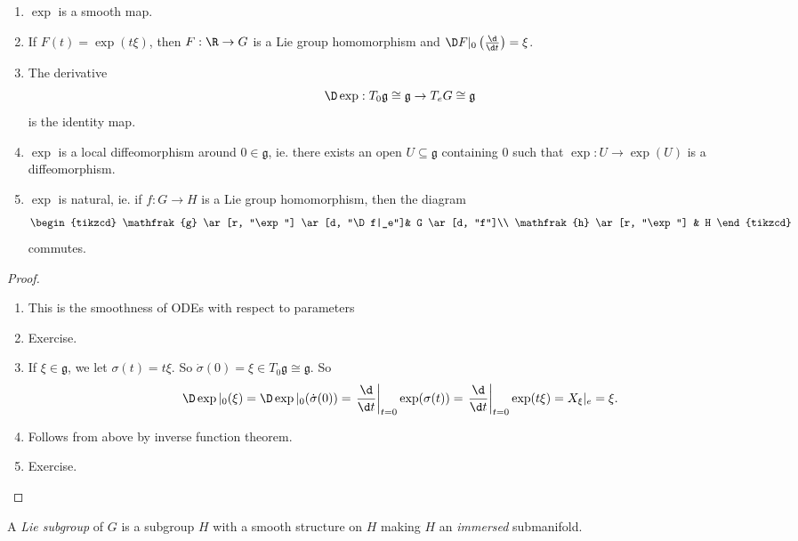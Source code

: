 \documentclass[a4paper]{article}
\begin{document}
\begin{prop}\leavevmode
  \begin{enumerate}
    \item $\exp$ is a smooth map.
    \item If $F(t) = \exp(t\xi)$, then $F: \R \to G$ is a Lie group homomorphism and $\D F|_0 \left(\frac{\d}{\d t}\right) = \xi$.
    \item The derivative
      \[
        \D \exp: T_0 \mathfrak{g} \cong \mathfrak{g} \to T_e G \cong \mathfrak{g}
      \]
      is the identity map.
    \item $\exp$ is a local diffeomorphism around $0 \in \mathfrak{g}$, ie. there exists an open $U \subseteq \mathfrak{g}$ containing $0$ such that $\exp: U \to \exp(U)$ is a diffeomorphism.
    \item $\exp$ is natural, ie. if $f: G \to H$ is a Lie group homomorphism, then the diagram
      \[
        \begin{tikzcd}
          \mathfrak{g} \ar[r, "\exp"] \ar[d, "\D f|_e"]& G \ar[d, "f"]\\
          \mathfrak{h} \ar[r, "\exp"] & H
        \end{tikzcd}
      \]
      commutes.
  \end{enumerate}
\end{prop}

\begin{proof}\leavevmode
  \begin{enumerate}
    \item This is the smoothness of ODEs with respect to parameters
    \item Exercise.
    \item If $\xi \in \mathfrak{g}$, we let $\sigma(t) = t \xi$. So $\dot{\sigma}(0) = \xi \in T_0 \mathfrak{g} \cong \mathfrak{g}$. So
      \[
        \D \exp|_0 (\xi) = \D \exp|_0(\dot{\sigma}(0)) = \left.\frac{\d}{\d t}\right|_{t = 0} \exp(\sigma(t)) = \left.\frac{\d}{\d t}\right|_{t = 0} \exp(t \xi) = X_\xi|_e = \xi.
      \]
    \item Follows from above by inverse function theorem.
    \item Exercise. \qedhere
  \end{enumerate}
\end{proof}

\begin{defi}
  A \emph{Lie subgroup} of $G$ is a subgroup $H$ with a smooth structure on $H$ making $H$ an \emph{immersed} submanifold.
\end{defi}
\end{document}
